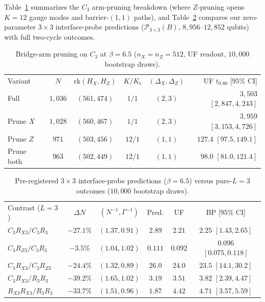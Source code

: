 \documentclass[aps,prx,reprint,superscriptaddress,nofootinbib,floatfix]{revtex4-2}
\begin{document}
Table~\ref{tab:pruning} summarizes the $C_3$ arm-pruning breakdown (where $Z$-pruning opens $K = 12$ gauge modes \cite{poulin2005} and barrier-$(1, 1)$ paths), and Table~\ref{tab:transfer} compares our zero-parameter $3 \times 3$ interface-probe predictions ($\mathcal{P}_{3\times 3}(B)$, $8{,}956\text{--}12{,}852$ qubits) with full two-cycle outcomes.

\begin{table}[!htbp]
\caption{Bridge-arm pruning on $C_3$ at $\beta = 6.5$ ($n_X = n_Z = 512$, UF readout, $10{,}000$ bootstrap draws).}
\label{tab:pruning}
{\scriptsize
\setlength{\tabcolsep}{1.1pt}
\begin{ruledtabular}
\begin{tabular}{lccccr}
Variant & $N$ & $\mathrm{rk}(H_X, H_Z)$ & $K/K_{\mathrm{t}}$ & $(\Delta_X,\Delta_Z)$ & UF $t_{0.80}$ [$95\%$ CI] \\
\colrule
Full & $1{,}036$ & $(561, 474)$ & $1/1$ & $(2, 3)$ & $3{,}503$ $[2{,}847, 4{,}243]$ \\
Prune $X$ & $1{,}028$ & $(560, 467)$ & $1/1$ & $(2, 3)$ & $3{,}959$ $[3{,}153, 4{,}726]$ \\
Prune $Z$ & $971$ & $(503, 456)$ & $12/1$ & $(1, 1)$ & $127.4$ $[97.5, 149.1]$ \\
Prune both & $963$ & $(502, 449)$ & $12/1$ & $(1, 1)$ & $98.0$ $[81.0, 121.4]$ \\
\end{tabular}
\end{ruledtabular}
}
\end{table}

\begin{table}[!htbp]
\caption{Pre-registered $3 \times 3$ interface-probe predictions ($\beta = 6.5$) versus pure-$L = 3$ outcomes ($10{,}000$ bootstrap draws).}
\label{tab:transfer}
{\scriptsize
\setlength{\tabcolsep}{1.0pt}
\begin{ruledtabular}
\begin{tabular}{lccccc}
Contrast ($L{=}3$) & $\Delta N$ & $(N^{-1},\Gamma^{-1})$ & Pred. & UF & BP [$95\%$ CI] \\
\colrule
$C_3 R_{X3} / C_3 R_3$ & $-27.1\%$ & $(1.37, 0.91)$ & $2.89$ & $2.21$ & $2.25$ $[1.43, 2.65]$ \\
$C_3 R_{Z3} / C_3 R_3$ & $-3.5\%$ & $(1.04, 1.02)$ & $0.111$ & $0.092$ & $0.096$ $[0.075, 0.118]$ \\
$C_3 R_{X3} / C_3 R_{Z3}$ & $-24.4\%$ & $(1.32, 0.89)$ & $26.0$ & $24.0$ & $23.5$ $[14.1, 30.2]$ \\
$C_3 R_{X3} / R_3 R_3$ & $-39.2\%$ & $(1.65, 1.02)$ & $3.19$ & $3.51$ & $3.82$ $[2.39, 4.47]$ \\
$R_{X3} R_{X3} / R_3 R_3$ & $-33.7\%$ & $(1.51, 0.96)$ & $1.87$ & $4.42$ & $4.71$ $[3.57, 5.59]$ \\
\end{tabular}
\end{ruledtabular}
}
\end{table}
\end{document}
